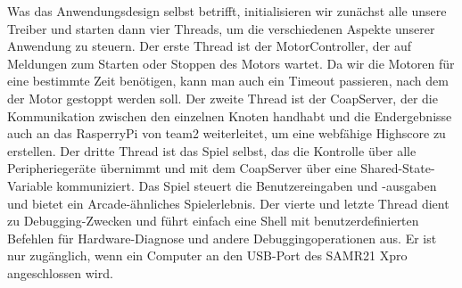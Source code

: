 \documentclass[a4paper]{article}
\begin{document}
Was das Anwendungsdesign selbst betrifft, initialisieren wir zunächst alle unsere Treiber und starten dann vier Threads, um die verschiedenen Aspekte unserer Anwendung zu steuern. Der erste Thread ist der MotorController, der auf Meldungen zum Starten oder Stoppen des Motors wartet. Da wir die Motoren für eine bestimmte Zeit benötigen, kann man auch ein Timeout passieren, nach dem der Motor gestoppt werden soll. Der zweite Thread ist der CoapServer, der die Kommunikation zwischen den einzelnen Knoten handhabt und die Endergebnisse auch an das RasperryPi von team2 weiterleitet, um eine webfähige Highscore zu erstellen. Der dritte Thread ist das Spiel selbst, das die Kontrolle über alle Peripheriegeräte übernimmt und mit dem CoapServer über eine Shared-State-Variable kommuniziert. Das Spiel steuert die Benutzereingaben und -ausgaben und bietet ein Arcade-ähnliches Spielerlebnis. Der vierte und letzte Thread dient zu Debugging-Zwecken und führt einfach eine Shell mit benutzerdefinierten Befehlen für Hardware-Diagnose und andere Debuggingoperationen aus. Er ist nur zugänglich, wenn ein Computer an den USB-Port des SAMR21 Xpro angeschlossen wird.
\end{document}
